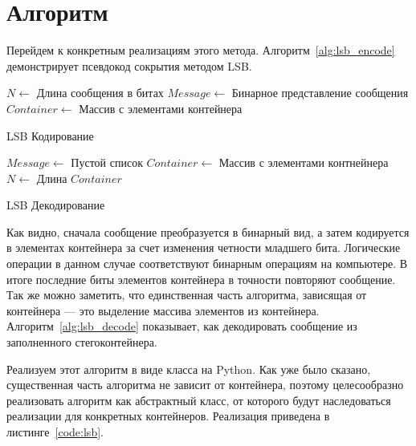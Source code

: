 \section{Алгоритм}
Перейдем к конкретным реализациям этого метода. Алгоритм~\ref{alg:lsb_encode}
демонстрирует псевдокод сокрытия методом LSB.
\begin{algorithm}[ht!]
     $N \leftarrow$ Длина сообщения в битах\;
     $Message \leftarrow$ Бинарное представление сообщения\;
     $Container \leftarrow$ Массив с элементами контейнера\;
     \caption{LSB Кодирование}
    \label{alg:lsb_encode}
\end{algorithm}
\begin{algorithm}[ht!]
    $Message \leftarrow$ Пустой список\;
    $Container \leftarrow$ Массив с элементами контнейнера\;
    $N \leftarrow$ Длина $Container$\;
    \caption{LSB Декодирование}
    \label{alg:lsb_decode}
\end{algorithm}

Как видно, сначала сообщение преобразуется в бинарный вид,
а затем кодируется в элементах контейнера за счет изменения четности младшего бита.
Логические операции в данном случае соответствуют бинарным операциям на компьютере.
В итоге последние биты элементов контейнера в точности повторяют сообщение.
Так же можно заметить, что единственная часть алгоритма, зависящая от контейнера
--- это выделение массива элементов из контейнера. Алгоритм~\ref{alg:lsb_decode}
показывает, как декодировать сообщение из заполненного стегоконтейнера.

Реализуем этот алгоритм в виде класса на Python. Как уже было сказано,
существенная часть алгоритма не зависит от контейнера,
поэтому целесообразно реализовать алгоритм как абстрактный класс,
от которого будут наследоваться реализации для конкретных контейнеров.
Реализация приведена в листинге~\ref{code:lsb}.


